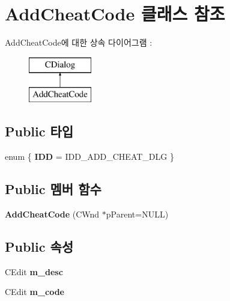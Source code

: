 \hypertarget{class_add_cheat_code}{}\section{Add\+Cheat\+Code 클래스 참조}
\label{class_add_cheat_code}
Add\+Cheat\+Code에 대한 상속 다이어그램 \+: \begin{figure}[H]
\begin{center}
\leavevmode
\includegraphics[height=2.000000cm]{class_add_cheat_code}
\end{center}
\end{figure}
\subsection*{Public 타입}
\begin{DoxyCompactItemize}
\item 
\mbox{\label{class_add_cheat_code_a360bc0f5ed2a9d0598c246993ecb57c2}} 
enum \{ {\bfseries I\+DD} = I\+D\+D\+\_\+\+A\+D\+D\+\_\+\+C\+H\+E\+A\+T\+\_\+\+D\+LG
 \}
\end{DoxyCompactItemize}
\subsection*{Public 멤버 함수}
\begin{DoxyCompactItemize}
\item 
\mbox{\label{class_add_cheat_code_a6904f72f50b5354c479d73ea19dba1ab}} 
{\bfseries Add\+Cheat\+Code} (C\+Wnd $\ast$p\+Parent=N\+U\+LL)
\end{DoxyCompactItemize}
\subsection*{Public 속성}
\begin{DoxyCompactItemize}
\item 
\mbox{\label{class_add_cheat_code_a5bbe6b54e71db26da7b3abc7449b3342}} 
C\+Edit {\bfseries m\+\_\+desc}
\item 
\mbox{\label{class_add_cheat_code_a9ae1d05acf10bc6fc8ea8cce2ec2cc6a}} 
C\+Edit {\bfseries m\+\_\+code}
\end{DoxyCompactItemize}
